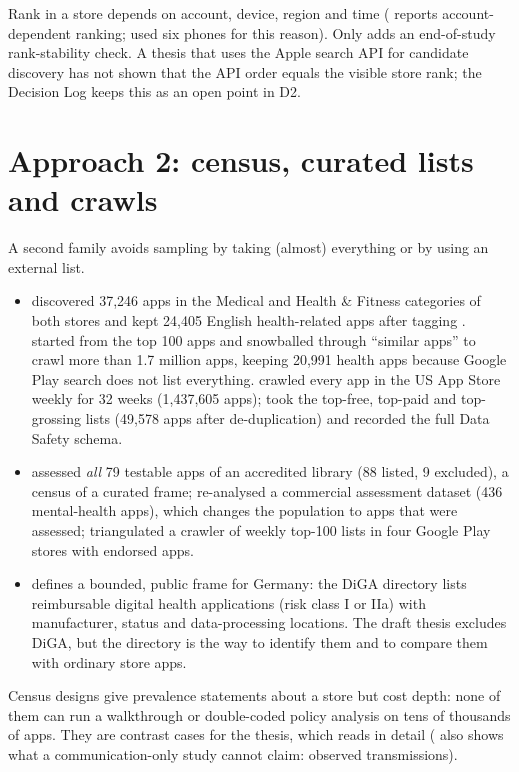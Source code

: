 \begin{notebox}
Rank in a store depends on account, device, region and time ( reports account-dependent ranking;  used six phones for this reason). Only  adds an end-of-study rank-stability check. A thesis that uses the Apple search API for candidate discovery has not shown that the API order equals the visible store rank; the Decision Log keeps this as an open point in D2.
\end{notebox}

\section{Approach 2: census, curated lists and crawls}
A second family avoids sampling by taking (almost) everything or by using an external list.
\begin{itemize}
\item {} discovered 37{,}246 apps in the Medical and Health \& Fitness categories of both stores  and kept 24{,}405 English health-related apps after tagging .  started from the top 100 apps and snowballed through ``similar apps'' to crawl more than 1.7 million apps, keeping 20{,}991 health apps because Google Play search does not list everything.  crawled every app in the US App Store weekly for 32 weeks (1{,}437{,}605 apps);  took the top-free, top-paid and top-grossing lists (49{,}578 apps after de-duplication) and recorded the full Data Safety schema.
\item {} assessed \emph{all} 79 testable apps of an accredited library (88 listed, 9 excluded), a census of a curated frame;  re-analysed a commercial assessment dataset (436 mental-health apps), which changes the population to apps that were assessed;  triangulated a crawler of weekly top-100 lists in four Google Play stores with endorsed apps.
\item {} defines a bounded, public frame for Germany: the DiGA directory lists reimbursable digital health applications (risk class I or IIa) with manufacturer, status and data-processing locations. The draft thesis excludes DiGA, but the directory is the way to identify them and to compare them with ordinary store apps.
\end{itemize}
Census designs give prevalence statements about a store but cost depth: none of them can run a walkthrough or double-coded policy analysis on tens of thousands of apps. They are contrast cases for the thesis, which reads in detail ( also shows what a communication-only study cannot claim: observed transmissions).


